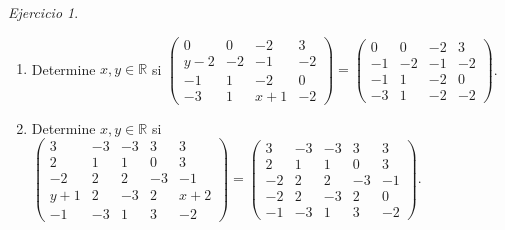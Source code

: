 \documentclass[12pt]{article}
\theoremstyle{remark}
\newtheorem{Ejer}[definicion]{Ejercicio}
\begin{document}
\begin{Ejer}
\begin{enumerate}[start=47]
\item Determine $x,y\in\mathbb R$ si $\begin{pmatrix}0&0&-2&3\\y - 2&-2&-1&-2\\-1&1&-2&0\\-3&1&x + 1&-2\end{pmatrix}=\begin{pmatrix}0&0&-2&3\\-1&-2&-1&-2\\-1&1&-2&0\\-3&1&-2&-2\end{pmatrix}$.

\item Determine $x,y\in\mathbb R$ si $\begin{pmatrix}3&-3&-3&3&3\\2&1&1&0&3\\-2&2&2&-3&-1\\y + 1&2&-3&2&x + 2\\-1&-3&1&3&-2\end{pmatrix}=\begin{pmatrix}3&-3&-3&3&3\\2&1&1&0&3\\-2&2&2&-3&-1\\-2&2&-3&2&0\\-1&-3&1&3&-2\end{pmatrix}$.

\end{enumerate}
\end{Ejer}
\end{document}
